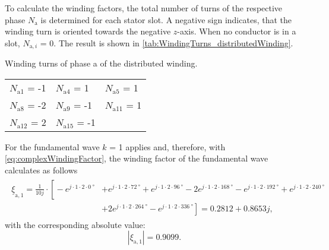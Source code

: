 \begin{solutionblock}
    To calculate the winding factors, the total number of turns of the respective phase $N_{\mathrm{a}}$ is determined for each stator slot. A negative sign indicates, that the winding turn is oriented towards the negative $z$-axis. When no conductor is in a slot, $N_{\mathrm{a,}i}$ = 0. The result is shown in \autoref{tab:WindingTurns_distributedWinding}.
    \begin{solutiontable}[ht]
        \caption{Winding turns of phase a of the distributed winding.}
        \centering
        \begin{tabular}{C{3cm}C{3cm}C{3cm}}\toprule
            $N_{\mathrm{a1}}$ = -1 & $N_{\mathrm{a4}}$ = 1   & $N_{\mathrm{a5}}$ = 1  \\
            $N_{\mathrm{a8}}$ = -2 & $N_{\mathrm{a9}}$ = -1  & $N_{\mathrm{a11}}$ = 1 \\
            $N_{\mathrm{a12}}$ = 2 & $N_{\mathrm{a15}}$ = -1 &                        \\
            \bottomrule
        \end{tabular}
        \label{tab:WindingTurns_distributedWinding}
    \end{solutiontable}

    For the fundamental wave $k$ = 1 applies and, therefore, with \eqref{eq:complexWindingFactor}, the winding factor of the fundamental wave calculates as follows
    \begin{align}
        \begin{split}
            \underline{\xi}_{\mathrm{a,}1} = \frac{1}{10j}\cdot \left[ \right. -e^{j\cdot1\cdot2\cdot\SI{0}{\degree}}
             & +e^{j\cdot1\cdot2\cdot\SI{72}{\degree}}+e^{j\cdot1\cdot2\cdot\SI{96}{\degree}}-2e^{j\cdot1\cdot2\cdot\SI{168}{\degree}}-e^{j\cdot1\cdot2\cdot\SI{192}{\degree}}
            +e^{j\cdot1\cdot2\cdot\SI{240}{\degree}}                                                                                                                           \\
             & +2e^{j\cdot1\cdot2\cdot\SI{264}{\degree}}-e^{j\cdot1\cdot2\cdot\SI{336}{\degree}}
            \left. \right]
            = 0.2812 + 0.8653j,
        \end{split}
    \end{align}
    with the corresponding absolute value:
    \begin{equation}
        |\xi_{\mathrm{a,}1}| = 0.9099.
    \end{equation}


\end{solutionblock}
